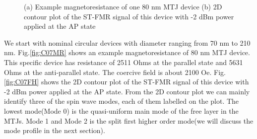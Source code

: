 \begin{figure}[!ht]
\centering
{}
\caption{(a) Example magnetoresistance of one 80 nm MTJ device (b) 2D contour plot of the ST-FMR signal of this device with -2 dBm power applied at the AP state  }
\end{figure}

We start with nominal circular devices with diameter ranging from 70 nm to 210 nm. Fig.\ref{fig:C07MR} shows an example magnetoresistance of 80 nm MTJ device. This specific device has resistance of 2511 Ohms at the parallel state and 5631 Ohms at the anti-parallel state. The coercive field is about 2100 Oe. Fig.\ref{fig:C07FH} shows the 2D contour plot of the ST-FMR signal of this device with -2 dBm power applied at the AP state. From the 2D contour plot we can mainly identify three of the spin wave modes, each of them labelled on the plot. The lowest mode(Mode 0) is the quasi-uniform main mode of the free layer in the MTJs. Mode 1 and Mode 2 is the split first higher order mode(we will discuss the mode profile in the next section).

